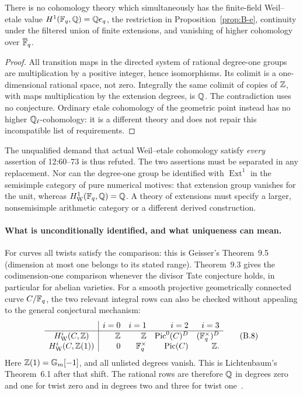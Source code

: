 \begin{proposition}\label{prop:B-continuity}
There is no cohomology theory which simultaneously has the finite-field
Weil--etale value \(H^1(\mathbb F_q,\mathbb Q)=\mathbb Q e_q\), the restriction in
Proposition~\ref{prop:B-e}, continuity under the filtered union of finite
extensions, and vanishing of higher cohomology over \(\overline{\mathbb F}_q\).
\end{proposition}
\begin{proof}
All transition maps in the directed system of rational degree-one
groups are multiplication by a positive integer, hence isomorphisms.
Its colimit is a one-dimensional rational space, not zero.  Integrally
the same colimit of copies of \(\mathbb Z\), with maps multiplication by the
extension degrees, is \(\mathbb Q\).  The contradiction uses no conjecture.
Ordinary etale cohomology of the geometric point instead has no higher
\(\mathbb Q_\ell\)-cohomology: it is a different theory and does not repair this
incompatible list of requirements.
\end{proof}

The unqualified demand that actual Weil--etale cohomology satisfy
\emph{every} assertion of 12:60--73 is thus refuted.  The two assertions
must be separated in any replacement.  Nor can the degree-one group be
identified with \(\operatorname{Ext}^1\) in the semisimple category of
pure numerical motives: that extension group vanishes for the unit,
whereas \(H^1_{\mathrm W}(\mathbb F_q,\mathbb Q)=\mathbb Q\).  A theory of extensions must specify
a larger, nonsemisimple arithmetic category or a different derived
construction.

\paragraph{What is unconditionally identified, and what uniqueness can mean.}
For curves all twists satisfy the comparison: this is Geisser's
Theorem~9.5 (dimension at most one belongs to its stated range).
Theorem~9.3 gives the codimension-one comparison whenever the divisor
Tate conjecture holds, in particular for abelian varieties.  For a smooth
projective geometrically connected curve \(C/\mathbb F_q\), the two relevant
integral rows can also be checked without appealing to the general
conjectural mechanism:
\[
\begin{array}{c|rrrr}
 &i=0&i=1&i=2&i=3\\ \hline
H^i_{\mathrm W}(C,\mathbb Z)&\mathbb Z&\mathbb Z&\operatorname{Pic}^0(C)^D&(\mathbb F_q^\times)^D\\
H^i_{\mathrm W}(C,\mathbb Z(1))&0&\mathbb F_q^\times&\operatorname{Pic}(C)&\mathbb Z .
\end{array}\tag{B.8}
\]
Here \(\mathbb Z(1)={\mathbb G_m}[-1]\), and all unlisted degrees vanish.  This is
Lichtenbaum's Theorem~6.1 after that shift.  The rational rows are
therefore \(\mathbb Q\) in degrees zero and one for twist zero and in degrees
two and three for twist one~\cite[Theorem~6.1]{BLichtenbaum2005}.

